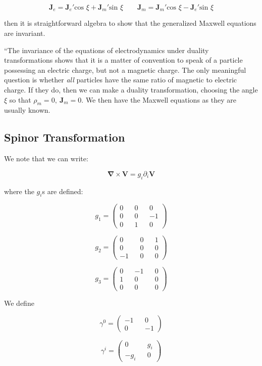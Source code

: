 \documentclass {article}
\renewcommand\vec{\mathbf}
\let\OldS\nabla
\renewcommand{\nabla}{\boldsymbol{\OldS}}
\begin{document}
$$\vec J_e = \vec J_e' \text{cos } \xi + \vec J_m' \text{sin } \xi ~~~~~~~~~ \vec J_m = \vec J_m' \text{cos } \xi  - \vec J_e' \text{sin } \xi $$

\noindent then it is straightforward algebra to show that the generalized Maxwell equations are invariant.

``The invariance of the equations of electrodynamics under duality transformations shows that it is a matter of convention to speak of a particle possessing an electric charge, but not a magnetic charge. The only meaningful question is whether \textit{all} particles have the same ratio of magnetic to electric charge. If they do, then we can make a duality transformation, choosing the angle $\xi$ so that $\rho_m = 0, ~ \vec J_m = 0$. We then have the Maxwell equations as they are usually known.

\newpage

\subsection{Spinor Transformation}

We note that we can write:

$$\nabla \times \vec V = g_i \partial_i \vec V $$

where the $g_i$s are defined:

$$g_1 = \left(\begin{matrix}  0 && 0 && 0 \\ 0 && 0 && -1 \\ 0 && 1 && 0 \end{matrix}\right) $$

$$g_2 = \left(\begin{matrix}  0 && 0 && 1 \\ 0 && 0 && 0 \\ -1 && 0 && 0 \end{matrix}\right) $$

$$g_3 = \left(\begin{matrix}  0 && -1 && 0 \\ 1 && 0 && 0 \\ 0 && 0 && 0 \end{matrix}\right) $$


We  define 

$$\gamma^0 = \left(\begin{matrix}  -1 && 0 \\ 0 && -1 \end{matrix}\right)$$

$$\gamma^i = \left(\begin{matrix}  0 && g_i \\ -g_i && 0 \end{matrix}\right)$$
\end{document}
